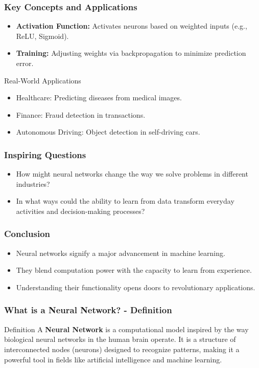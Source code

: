 \documentclass[aspectratio=169]{beamer}
\begin{document}
\begin{frame}[fragile]
    \frametitle{Key Concepts and Applications}
    \begin{itemize}
        \item \textbf{Activation Function:} Activates neurons based on weighted inputs (e.g., ReLU, Sigmoid).
        \item \textbf{Training:} Adjusting weights via backpropagation to minimize prediction error.
    \end{itemize}
    
    \begin{block}{Real-World Applications}
        \begin{itemize}
            \item Healthcare: Predicting diseases from medical images.
            \item Finance: Fraud detection in transactions.
            \item Autonomous Driving: Object detection in self-driving cars.
        \end{itemize}
    \end{block}
\end{frame}

\begin{frame}[fragile]
    \frametitle{Inspiring Questions}
    \begin{itemize}
        \item How might neural networks change the way we solve problems in different industries?
        \item In what ways could the ability to learn from data transform everyday activities and decision-making processes?
    \end{itemize}
\end{frame}

\begin{frame}[fragile]
    \frametitle{Conclusion}
    \begin{itemize}
        \item Neural networks signify a major advancement in machine learning.
        \item They blend computation power with the capacity to learn from experience.
        \item Understanding their functionality opens doors to revolutionary applications.
    \end{itemize}
\end{frame}

\begin{frame}[fragile]
    \frametitle{What is a Neural Network? - Definition}
    \begin{block}{Definition}
        A \textbf{Neural Network} is a computational model inspired by the way biological neural networks in the human brain operate. It is a structure of interconnected nodes (neurons) designed to recognize patterns, making it a powerful tool in fields like artificial intelligence and machine learning.
    \end{block}
\end{frame}
\end{document}
